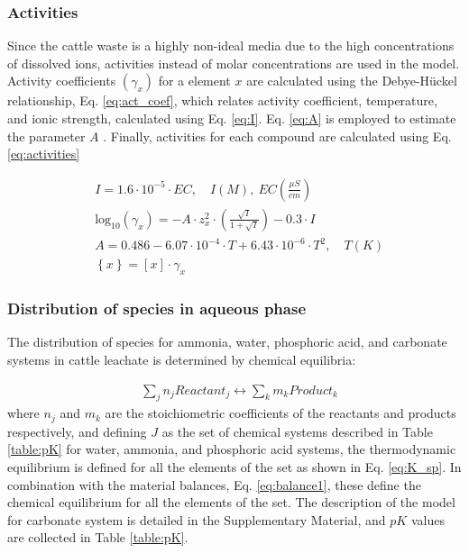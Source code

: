 \begin{refsection}[referencesCh3]
\subsubsection{Activities} \label{Activity coefficients}
Since the cattle waste is a highly non-ideal media due to the high concentrations of dissolved ions, activities instead of molar concentrations are used in the model. Activity coefficients $\left(\gamma_{x}\right)$ for a element $x$ are calculated using the Debye-H\"{u}ckel relationship, Eq. \ref{eq:act_coef}, which relates activity coefficient, temperature, and ionic strength, calculated using Eq. \ref{eq:I}. Eq. \ref{eq:A} is employed to estimate the parameter $A$ \citep{Tao, Metcalf}. Finally, activities for each compound are calculated using Eq. \ref{eq:activities}

\begin{align}
& I = 1.6 \cdot 10^{-5} \cdot EC, \quad  I \left(  M \right),  \  
EC \left( \frac{\mu S}{cm} \right) \label{eq:I} \\
& \text{log}_\text{10} (\gamma_{x}) =   -A \cdot z_{x}^{2} \cdot \left( \frac{\sqrt{I}} { 1+\sqrt{I}} \right)- 0.3 \cdot I \label{eq:act_coef}\\ 
& A= 0.486-6.07\cdot 10^{-4}  \cdot  T + 6.43\cdot 10^{-6}  \cdot T^{2}, \quad T(K) \label{eq:A}
\\
& \left\{  x \right\} = \left[ x \right] \cdot \gamma_{x} \label{eq:activities}
\end{align}

\subsubsection{Distribution of species in aqueous phase} \label{first_opt_problem}
The distribution of species for ammonia, water, phosphoric acid, and carbonate systems in cattle leachate is determined by chemical equilibria:

\begin{align}
& \sum_{j} n_{j} Reactant_{j}  \leftrightarrow \sum_{k} m_{k} Product_{k}
\end{align}
where $n_{j}$ and $m_{k}$ are the stoichiometric coefficients of the reactants and products respectively, and defining $J$ as the set of chemical systems described in Table \ref{table:pK} for water, ammonia, and phosphoric acid systems, the thermodynamic equilibrium is defined for all the elements of the set as shown in Eq. \ref{eq:K_sp}. In combination with the material balances, Eq. \ref{eq:balance1}, these define the chemical equilibrium for all the elements of the set. The description of the model for carbonate system is detailed in the Supplementary Material, and $pK$ values are collected in Table \ref{table:pK}.


\end{refsection}
